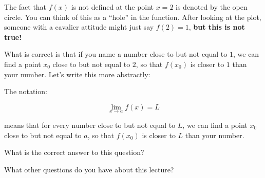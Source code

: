 \documentclass{ximera}
\begin{document}
The fact that $f(x)$ is not defined at the point $x=2$ is denoted by
the open circle. You can think of this as a ``hole'' in the
function. After looking at the plot, someone with a cavalier attitude
might just say $f(2) = 1$, \textbf{but this is not true!}

What is correct is that if you name a number close to but not equal to
$1$, we can find a point $x_0$ close to but not equal to $2$, so that
$f(x_0)$ is closer to $1$ than your number. Let's write this more
abstractly:

\begin{definition}
The notation:

\[
\lim_{x\to a} f(x) = L
\]

means that for every number close to but not equal to $L$, we can find
a point $x_0$ close to but not equal to $a$, so that $f(x_0)$ is
closer to $L$ than your number.
\end{definition}




\begin{question}
  What is the correct answer to this question?

  \begin{solution}
    \begin{multiple-choice}
    \end{multiple-choice}  
  \end{solution}
\end{question}

What other questions do you have about this lecture?
\begin{free-response}
\end{free-response}
\end{document}
